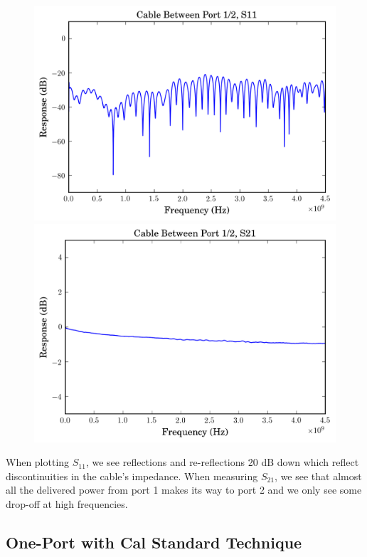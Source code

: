 \documentclass[11pt]{article}
\begin{document}
\begin{figure}[H]
	\includegraphics[width=\linewidth]{images/cable_phase_s11.png}
	\endminipage\hfill
	\includegraphics[width=\linewidth]{images/cable_phase_s21.png}
	\endminipage
\end{figure}

When plotting $S_{11}$, we see reflections and re-reflections 20 dB down which reflect discontinuities in the cable's impedance. When measuring $S_{21}$, we see that almost all the delivered power from port 1 makes its way to port 2 and we only see some drop-off at high frequencies.

\subsection{One-Port with Cal Standard Technique}

\section{}
\end{document}
